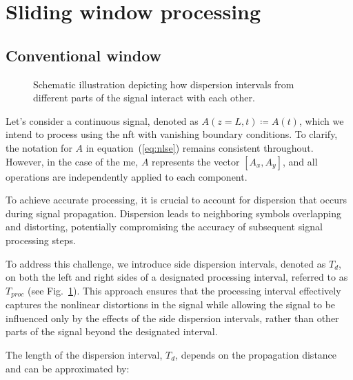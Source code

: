\section{Sliding window processing}
\subsection{Conventional window}

\begin{figure}[!bp]
\caption{Schematic illustration depicting how dispersion intervals from different parts of the signal interact with each other.}
\label{fig:periodical_signal}
\end{figure}

Let's consider a continuous signal, denoted as $A(z = L, t) \coloneqq A(t)$, which we intend to process using the \acrshort{nft} with vanishing boundary conditions. To clarify, the notation for $A$ in equation~(\ref{eq:nlse}) remains consistent throughout. However, in the case of the \acrlong{me}, $A$ represents the vector $[A_x, A_y]$, and all operations are independently applied to each component.

To achieve accurate processing, it is crucial to account for dispersion that occurs during signal propagation. Dispersion leads to neighboring symbols overlapping and distorting, potentially compromising the accuracy of subsequent signal processing steps.

To address this challenge, we introduce side dispersion intervals, denoted as $T_d$, on both the left and right sides of a designated processing interval, referred to as $T_{proc}$ (see Fig.~\ref{fig:periodical_signal}). This approach ensures that the processing interval effectively captures the nonlinear distortions in the signal while allowing the signal to be influenced only by the effects of the side dispersion intervals, rather than other parts of the signal beyond the designated interval.

The length of the dispersion interval, $T_d$, depends on the propagation distance and can be approximated by:

